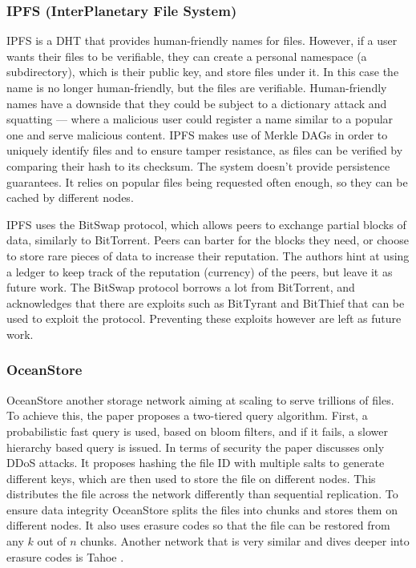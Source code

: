 \subsubsection{IPFS (InterPlanetary File System)}
IPFS is a DHT that provides human-friendly names for files.
However, if a user wants their files to be verifiable, they can create a personal namespace (a subdirectory),
which is their public key, and store files under it.
In this case the name is no longer human-friendly, but the files are verifiable.
Human-friendly names have a downside that they could be subject to a dictionary attack and
squatting --- where a malicious user could register a name similar to a popular one and
serve malicious content.
IPFS makes use of Merkle DAGs in order to uniquely identify files and to ensure tamper resistance,
as files can be verified by comparing their hash to its checksum.
The system doesn't provide persistence guarantees.
It relies on popular files being requested often enough, so they can be cached by different nodes.

IPFS \cite{ipfs} uses the BitSwap protocol, which allows peers to exchange partial blocks of data,
similarly to BitTorrent.
Peers can barter for the blocks they need, or choose to store rare pieces of data to increase their reputation.
The authors hint at using a ledger to keep track of the reputation (currency) of the peers,
but leave it as future work.
The BitSwap protocol borrows a lot from BitTorrent, and acknowledges that there are exploits such as
BitTyrant \cite{bittorrentexploits} and BitThief \cite{bittorrentexploits}
that can be used to exploit the protocol.
Preventing these exploits however are left as future work.

\subsubsection{OceanStore}

OceanStore \cite{oceanstore} another storage network aiming at scaling to serve trillions of files.
To achieve this, the paper proposes a two-tiered query algorithm.
First, a probabilistic fast query is used, based on bloom filters, and if it fails,
a slower hierarchy based query is issued.
In terms of security the paper discusses only DDoS attacks.
It proposes hashing the file ID with multiple salts to generate different keys,
which are then used to store the file on different nodes.
This distributes the file across the network differently than sequential replication.
To ensure data integrity OceanStore splits the files into chunks and stores them on different nodes.
It also uses erasure codes so that the file can be restored from any $k$ out of $n$ chunks.
Another network that is very similar and dives deeper into erasure codes is Tahoe \cite{tahoe}.

